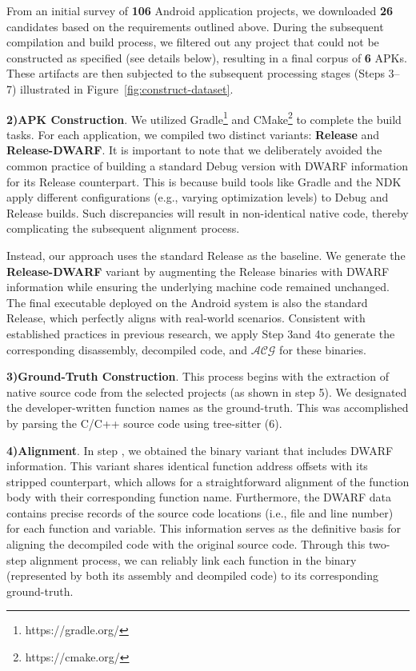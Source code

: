 \documentclass[acmsmall,screen,review,anonymous]{acmart} %
\begin{document}
From an initial survey of \textbf{106} Android application projects, we downloaded \textbf{26} candidates based on the requirements outlined above. During the subsequent compilation and build process, we filtered out any project that could not be constructed as specified (see details below), resulting in a final corpus of \textbf{6} APKs. These artifacts are then subjected to the subsequent processing stages (Steps \normalsize{\textcircled{\scriptsize{3}}}\normalsize–\normalsize{\textcircled{\scriptsize{7}}}\normalsize) illustrated in Figure~\ref{fig:construct-dataset}.


\textbf{2)APK Construction}. We utilized Gradle\footnote{https://gradle.org/} and CMake\footnote{https://cmake.org/} to complete the build tasks. For each application, we compiled two distinct variants: \textbf{Release} and \textbf{Release-DWARF}. It is important to note that we deliberately avoided the common practice of building a standard Debug version with DWARF information for its Release counterpart. This is because build tools like Gradle and the NDK\cite{NDK} apply different configurations (e.g., varying optimization levels) to Debug and Release builds. Such discrepancies will result in non-identical native code, thereby complicating the subsequent alignment process.

Instead, our approach uses the standard Release as the baseline. We generate the \textbf{Release-DWARF} variant by augmenting the Release binaries with DWARF information while ensuring the underlying machine code remained unchanged. The final executable deployed on the Android system is also the standard Release, which perfectly aligns with real-world scenarios. Consistent with established practices in previous research, we apply Step \normalsize{\textcircled{\scriptsize{3}}}\normalsize and  \normalsize{\textcircled{\scriptsize{4}}}\normalsize to generate the corresponding disassembly, decompiled code, and $\mathcal{ACG}$ for these binaries.


\textbf{3)Ground-Truth Construction}. This process begins with the extraction of native source code from the selected projects (as shown in step \normalsize{\textcircled{\scriptsize{5}}}\normalsize). We designated the developer-written function names as the ground-truth. This was accomplished by parsing the C/C++ source code using tree-sitter\cite{tree_sitter} (\normalsize{\textcircled{\scriptsize{6}}}\normalsize).

\textbf{4)Alignment}. In step , we obtained the binary variant that includes DWARF information. This variant shares identical function address offsets with its stripped counterpart, which allows for a straightforward alignment of the function body with their corresponding function name. Furthermore, the DWARF data contains precise records of the source code locations (i.e., file and line number) for each function and variable. This information serves as the definitive basis for aligning the decompiled code with the original source code. Through this two-step alignment process, we can reliably link each function in the binary (represented by both its assembly and deompiled code) to its corresponding ground-truth.
\end{document}
